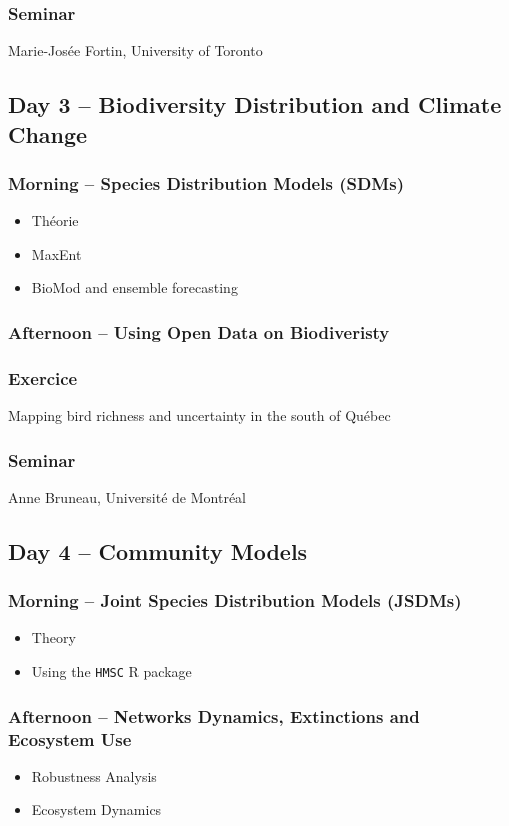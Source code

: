 \documentclass[12]{article}
\begin{document}
  \subsubsection*{Seminar}
  Marie-Josée Fortin, University of Toronto

  \subsection*{Day 3 -- Biodiversity Distribution and Climate Change}
  \subsubsection*{Morning -- Species Distribution Models (SDMs)}
  \begin{itemize}
    \item Théorie
    \item MaxEnt
    \item BioMod and ensemble forecasting
  \end{itemize}
  \subsubsection*{Afternoon -- Using Open Data on Biodiveristy}
  \subsubsection*{Exercice}
  Mapping bird richness and uncertainty in the south of Québec

  \subsubsection*{Seminar}
  Anne Bruneau, Université de Montréal

  \subsection*{Day 4 -- Community Models}
  \subsubsection*{Morning -- Joint Species Distribution Models (JSDMs)}
  \begin{itemize}
    \item Theory
    \item Using the \texttt{HMSC} R package
  \end{itemize}
  \subsubsection*{Afternoon -- Networks Dynamics, Extinctions and Ecosystem Use}
  \begin{itemize}
    \item Robustness Analysis
    \item Ecosystem Dynamics
  \end{itemize}
\end{document}
